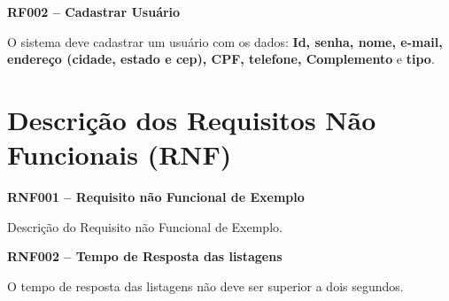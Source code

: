 \documentclass[notitlepage, draft]{article}
\begin{document}
        \begin{table}[H]
        
            \begin{tcolorbox}
                \textbf{RF002 – Cadastrar Usuário}
            \end{tcolorbox}


            \quad O sistema deve cadastrar um usuário com os dados: \textbf{Id, senha, nome, e-mail, endereço (cidade, estado e cep), CPF, telefone, Complemento} e \textbf{tipo}.
        \end{table}
 
    \newpage
    
    \section{Descrição dos Requisitos Não Funcionais (RNF)}
    
        \begin{table}[H] 
        
            \begin{tcolorbox}
                \textbf{RNF001 – Requisito não Funcional de Exemplo}
            \end{tcolorbox}
        
            \quad Descrição do Requisito não Funcional de Exemplo.
            
        \end{table}
        
        \begin{table}[H]
            \begin{tcolorbox}
                \textbf{RNF002 – Tempo de Resposta das listagens}
            \end{tcolorbox}

            \quad O tempo de resposta das listagens não deve ser superior a dois segundos.

        \end{table}
\end{document}
